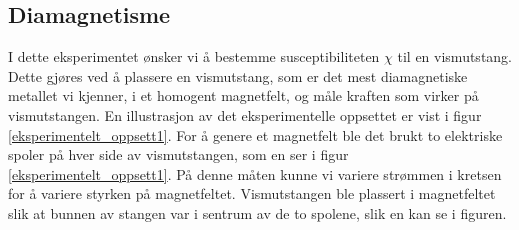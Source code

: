 \documentclass[%
 reprint,
nofootinbib,
aps,
]{revtex4-1}
\begin{document}
\subsection{Diamagnetisme}
I dette eksperimentet ønsker vi å bestemme susceptibiliteten $\chi$ til en vismutstang. Dette gjøres ved å plassere en vismutstang, som er det mest diamagnetiske metallet vi kjenner, i et homogent magnetfelt, og måle kraften som virker på vismutstangen. En illustrasjon av det eksperimentelle oppsettet er vist i figur \vref{eksperimentelt_oppsett1}. For å genere et magnetfelt ble det brukt to elektriske spoler på hver side av vismutstangen, som en ser i figur \vref{eksperimentelt_oppsett1}. På denne måten kunne vi variere strømmen i kretsen for å variere styrken på magnetfeltet. Vismutstangen ble plassert i magnetfeltet slik at bunnen av stangen var i sentrum av de to spolene, slik en kan se i figuren.
\end{document}
